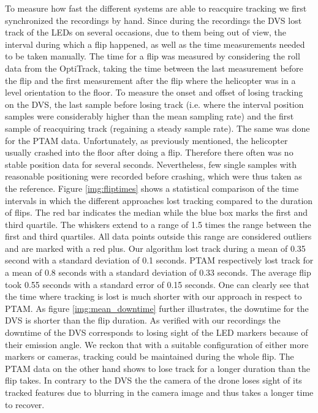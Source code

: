 To measure how fast the different systems are able to reacquire tracking we first synchronized the recordings by hand. Since during the recordings the DVS lost track of the LEDs on several occasions, due to them being out of view, the interval during which a flip happened, as well as the time measurements needed to be taken manually. The time for a flip was measured by considering the roll data from the OptiTrack, taking the time between the last measurement before the flip and the first measurement after the flip where the helicopter was in a level orientation to the floor. To measure the onset and offset of losing tracking on the DVS, the last sample before losing track (i.e.  where the interval position samples were considerably higher than the mean sampling rate) and the first sample of reacquiring track (regaining a steady sample rate).  The same was done for the PTAM data. Unfortunately, as previously mentioned, the helicopter usually crashed into the floor after doing a flip. Therefore there often was no stable position data for several seconds. Nevertheless, few single samples with reasonable positioning were recorded before crashing, which were thus taken as the reference. Figure \ref{img:fliptimes} shows a statistical comparison of the time intervals in which the different approaches lost tracking compared to the duration of flips. The red bar indicates the median while the blue box marks the first and third quartile. The whiskers extend to a range of 1.5 times the range between the first and third quartiles. All data points outside this range are considered outliers and are marked with a red plus. Our algorithm lost track during a mean of 0.35 second with a standard deviation of 0.1 seconds. PTAM respectively lost track for a mean of 0.8 seconds with a standard deviation of 0.33 seconds. The average flip took 0.55 seconds with a standard error of 0.15 seconds. One can clearly see that the time where tracking is lost is much shorter with our approach in respect to PTAM. As figure \ref{img:mean_downtime} further illustrates, the downtime for the DVS is shorter than the flip duration. As verified with our recordings the downtime of the DVS corresponds to losing sight of the LED markers because of their emission angle. We reckon that with a suitable configuration of either more markers or cameras, tracking could be maintained during the whole flip. The PTAM data on the other hand shows to lose track for a longer duration than the flip takes. In contrary to the DVS the the camera of the drone loses sight of its tracked features due to blurring in the camera image and thus takes a longer time to recover.

